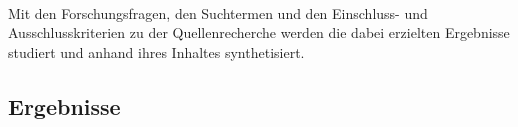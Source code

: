         \\
        Mit den Forschungsfragen, den Suchtermen und den Einschluss- und Ausschlusskriterien zu der Quellenrecherche werden die dabei erzielten Ergebnisse 
        studiert und anhand ihres Inhaltes synthetisiert. 

    \subsection{Ergebnisse}


